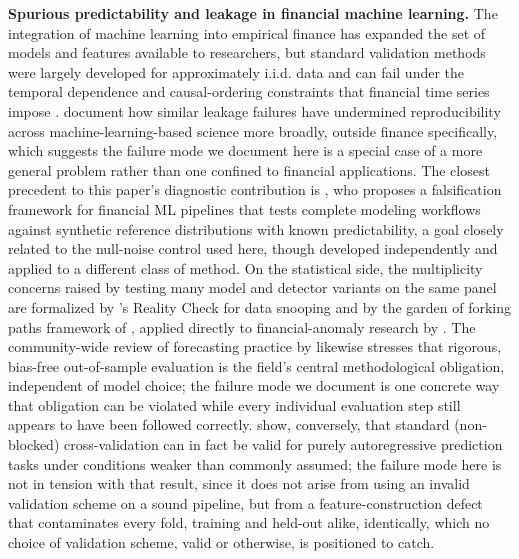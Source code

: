 \documentclass[preprint,12pt]{elsarticle}
\begin{document}
\textbf{Spurious predictability and leakage in financial machine learning.} The integration of
machine learning into empirical finance has expanded the set of models and features available
to researchers, but standard validation methods were largely developed for approximately i.i.d.
data and can fail under the temporal dependence and causal-ordering constraints that financial
time series impose \citep{kaufman2012}. \citet{kapoor2023} document how similar leakage
failures have undermined reproducibility across machine-learning-based science more broadly,
outside finance specifically, which suggests the failure mode we document here is a special
case of a more general problem rather than one confined to financial applications. The closest
precedent to this paper's diagnostic contribution is \citet{nikolopoulos2026}, who proposes a
falsification framework for financial
ML pipelines that tests complete modeling workflows against synthetic reference distributions
with known predictability, a goal closely related to the null-noise control used here, though
developed independently and applied to a different class of method. On the statistical side,
the multiplicity concerns raised by testing many model and detector variants on the same panel
are formalized by \citet{white2000}'s Reality Check for data snooping and by the garden of
forking paths framework of \citet{gelman2013}, applied directly to financial-anomaly research
by \citet{coqueret2024}. The community-wide review of forecasting practice by
\citet{petropoulos2022} likewise stresses that rigorous, bias-free out-of-sample evaluation is
the field's central methodological obligation, independent of model choice; the failure mode we
document is one concrete way that obligation can be violated while every individual evaluation
step still appears to have been followed correctly. \citet{bergmeir2018} show, conversely, that
standard (non-blocked) cross-validation can in fact be valid for purely autoregressive
prediction tasks under conditions weaker than commonly assumed; the failure mode here is not in
tension with that result, since it does not arise from using an invalid validation scheme on a
sound pipeline, but from a feature-construction defect that contaminates every fold, training and
held-out alike, identically, which no choice of validation scheme, valid or otherwise, is
positioned to catch.
\end{document}
